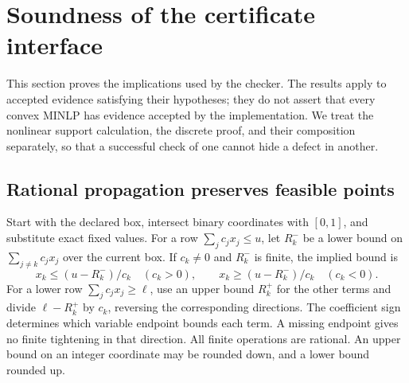 \section{Soundness of the certificate interface}
\label{sec:soundness}
This section proves the implications used by the checker. The results apply to accepted evidence satisfying their hypotheses; they do not assert that every convex MINLP has evidence accepted by the implementation. We treat the nonlinear support calculation, the discrete proof, and their composition separately, so that a successful check of one cannot hide a defect in another.

\subsection{Rational propagation preserves feasible points}
\label{sec:propagation}
Start with the declared box, intersect binary coordinates with $[0,1]$, and substitute exact fixed values. For a row $\sum_j c_jx_j\leq u$, let $R_k^-$ be a lower bound on $\sum_{j\ne k}c_jx_j$ over the current box. If $c_k\ne0$ and $R_k^-$ is finite, the implied bound is
\begin{equation}
 x_k\leq (u-R_k^-)/c_k\quad(c_k>0),\qquad
 x_k\geq (u-R_k^-)/c_k\quad(c_k<0).
 \label{eq:propagate-upper}
\end{equation}
For a lower row $\sum_jc_jx_j\geq\ell$, use an upper bound $R_k^+$ for the other terms and divide $\ell-R_k^+$ by $c_k$, reversing the corresponding directions. The coefficient sign determines which variable endpoint bounds each term. A missing endpoint gives no finite tightening in that direction. All finite operations are rational. An upper bound on an integer coordinate may be rounded down, and a lower bound rounded up.

